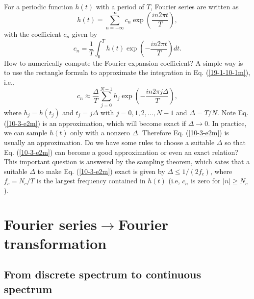 \documentclass{article}
\begin{document}
For a periodic function $h (t)$ with a period of $T$, Fourier series are
written as
\begin{equation}
  h (t) = \sum_{n = - \infty}^{\infty} c_n \exp \left( \frac{i n 2 \pi t}{T}
  \right),
\end{equation}
with the coefficient $c_n$ given by
\begin{equation}
  \label{19-1-10-1m} c_n = \frac{1}{T} \int_0^T h (t) \exp \left( - \frac{i n
  2 \pi t}{T} \right) d t.
\end{equation}
How to numerically compute the Fourier expansion coefficient? A simple way is
to use the rectangle formula to approximate the integration in Eq.
(\ref{19-1-10-1m}), i.e.,
\begin{equation}
  \label{10-3-e2m} c_n \approx \frac{\Delta}{T} \sum_{j = 0}^{N - 1} h_j \exp
  \left( - \frac{i n 2 \pi j \Delta}{T} \right),
\end{equation}
where $h_j = h (t_j)$ and $t_j = j \Delta$ with $j = 0, 1, 2, \ldots, N - 1$
and $\Delta = T / N$. Note Eq. (\ref{10-3-e2m}) is an approximation, which
will become exact if $\Delta \rightarrow 0$. In practice, we can sample $h
(t)$ only with a nonzero $\Delta$. Therefore Eq. (\ref{10-3-e2m}) is usually
an approximation. Do we have some rules to choose a suitable $\Delta$ so that
Eq. (\ref{10-3-e2m}) can become a good approximation or even an exact
relation? This important question is answered by the sampling theorem, which
sates that a suitable $\Delta$ to make Eq. (\ref{10-3-e2m}) exact is given by
$\Delta \leqslant 1 / (2 f_c)$, where $f_c = N_c / T$ is the largest frequency
contained in $h (t)$ (i.e, $c_n$ is zero for $| n | \geqslant N_c$).

\section{Fourier series$\rightarrow$Fourier transformation}

\subsection{From discrete spectrum to continuous spectrum}
\end{document}
